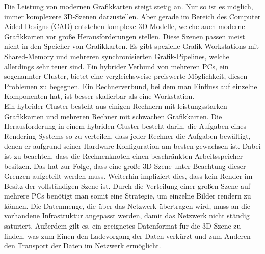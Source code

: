 Die Leistung von modernen Grafikkarten steigt stetig an. Nur so ist es möglich, immer komplexere 3D-Szenen darzustellen. Aber gerade im Bereich des Computer Aided Designs (CAD) entstehen komplexe 3D-Modelle, welche auch moderne Grafikkarten vor große Herausforderungen stellen. Diese Szenen passen meist nicht in den Speicher von Grafikkarten. Es gibt spezielle Grafik-Workstations mit Shared-Memory und mehreren synchronisierten Grafik-Pipelines, welche allerdings sehr teuer sind. Ein hybrider Verbund von mehreren PCs, ein sogenannter Cluster, bietet eine vergleichsweise preiswerte Möglichkeit, diesen Problemen zu begegnen. Ein Rechnerverbund, bei dem man Einfluss auf einzelne Komponenten hat, ist besser skalierbar als eine Workstation.\\
Ein hybrider Cluster besteht aus einigen Rechnern mit leistungsstarken Grafikkarten und mehreren Rechner mit schwachen Grafikkarten. Die Herausforderung in einem hybriden Cluster besteht darin, die Aufgaben eines Rendering-Systems so zu verteilen, dass jeder Rechner die Aufgaben bewältigt, denen er aufgrund seiner Hardware-Konfiguration am besten gewachsen ist. Dabei ist zu beachten, dass die Rechnenknoten einen beschränkten Arbeitsspeicher besitzen. Das hat zur Folge, dass eine große 3D-Szene unter Beachtung dieser Grenzen aufgeteilt werden muss. Weiterhin impliziert dies, dass kein Render im Besitz der vollständigen Szene ist. Durch die Verteilung einer großen Szene auf mehrere PCs benötigt man somit eine Strategie, um einzelne Bilder rendern zu können. Die Datenmenge, die über das Netzwerk übertragen wird, muss an die vorhandene Infrastruktur angepasst werden, damit das Netzwerk nicht ständig saturiert. Außerdem gilt es, ein geeignetes Datenformat für die 3D-Szene zu finden, was zum Einen den Ladevorgang der Daten verkürzt und zum Anderen den Transport der Daten im Netzwerk ermöglicht.

